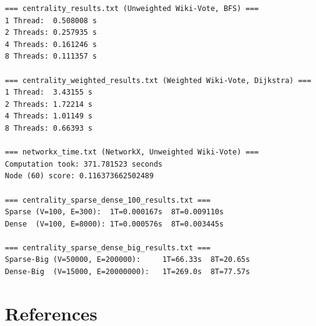 \documentclass[12pt,a4paper]{article}
\begin{document}
\begin{verbatim}
=== centrality_results.txt (Unweighted Wiki-Vote, BFS) ===
1 Thread:  0.508008 s
2 Threads: 0.257935 s
4 Threads: 0.161246 s
8 Threads: 0.111357 s

=== centrality_weighted_results.txt (Weighted Wiki-Vote, Dijkstra) ===
1 Thread:  3.43155 s
2 Threads: 1.72214 s
4 Threads: 1.01149 s
8 Threads: 0.66393 s

=== networkx_time.txt (NetworkX, Unweighted Wiki-Vote) ===
Computation took: 371.781523 seconds
Node (60) score: 0.116373662502489

=== centrality_sparse_dense_100_results.txt ===
Sparse (V=100, E=300):  1T=0.000167s  8T=0.009110s
Dense  (V=100, E=8000): 1T=0.000576s  8T=0.003445s

=== centrality_sparse_dense_big_results.txt ===
Sparse-Big (V=50000, E=200000):     1T=66.33s  8T=20.65s
Dense-Big  (V=15000, E=20000000):   1T=269.0s  8T=77.57s
\end{verbatim}

\section*{References}
\end{document}
